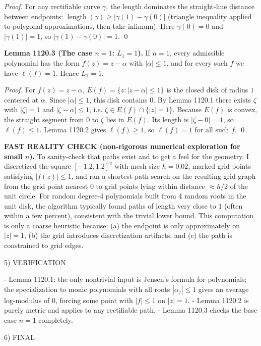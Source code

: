 \emph{Proof.}
For any rectifiable curve \(\gamma\), the length dominates the straight-line distance between endpoints:
\(\operatorname{length}(\gamma)\ge |\gamma(1)-\gamma(0)|\) (triangle inequality applied to polygonal approximations, then take infimum).
Here \(\gamma(0)=0\) and \(|\gamma(1)|=1\), so \(|\gamma(1)-\gamma(0)|=1\). \qed

\textbf{Lemma 1120.3 (The case \(n=1\): \(L_1=1\)).}
If \(n=1\), every admissible polynomial has the form \(f(z)=z-\alpha\) with \(|\alpha|\le 1\), and for every such \(f\) we have \(\ell(f)=1\). Hence \(L_1=1\).

\emph{Proof.}
For \(f(z)=z-\alpha\),
\(E(f)=\{z:|z-\alpha|\le 1\}\) is the closed disk of radius \(1\) centered at \(\alpha\). Since \(|\alpha|\le 1\), this disk contains \(0\).
By Lemma 1120.1 there exists \(\zeta\) with \(|\zeta|=1\) and \(|\zeta-\alpha|\le 1\), i.e. \(\zeta\in E(f)\cap\{|z|=1\}\).
Because \(E(f)\) is convex, the straight segment from \(0\) to \(\zeta\) lies in \(E(f)\). Its length is \(|\zeta-0|=1\), so \(\ell(f)\le 1\). Lemma 1120.2 gives \(\ell(f)\ge 1\), so \(\ell(f)=1\) for all such \(f\). \qed

\textbf{FAST REALITY CHECK (non-rigorous numerical exploration for small \(n\)).}
To sanity-check that paths exist and to get a feel for the geometry, I discretized the square \([-1.2,1.2]^2\) with mesh size \(h=0.02\), marked grid points satisfying \(|f(z)|\le 1\), and ran a shortest-path search on the resulting grid graph from the grid point nearest \(0\) to grid points lying within distance \(\approx h/2\) of the unit circle. For random degree-4 polynomials built from 4 random roots in the unit disk, the algorithm typically found paths of length very close to \(1\) (often within a few percent), consistent with the trivial lower bound. This computation is only a coarse heuristic because:
(a) the endpoint is only approximately on \(|z|=1\),
(b) the grid introduces discretization artifacts, and
(c) the path is constrained to grid edges.

5) VERIFICATION

- Lemma 1120.1: the only nontrivial input is Jensen's formula for polynomials; the specialization to monic polynomials with all roots \(|\alpha_j|\le 1\) gives an average log-modulus of \(0\), forcing some point with \(|f|\le 1\) on \(|z|=1\).
- Lemma 1120.2 is purely metric and applies to any rectifiable path.
- Lemma 1120.3 checks the base case \(n=1\) completely.

6) FINAL

